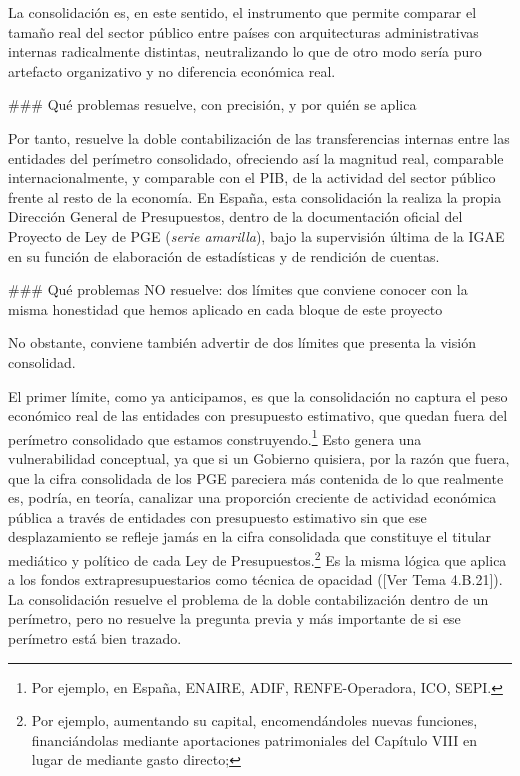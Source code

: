 \documentclass[10pt,a4paper]{article}
\newcommand{\authorfont}[1]{{\fontfamily{EBGaramond-TLF}\selectfont #1}}
\begin{document}
La consolidación es, en este sentido, el instrumento que permite comparar el tamaño real del sector público entre países con arquitecturas administrativas internas radicalmente distintas, neutralizando lo que de otro modo sería puro artefacto organizativo y no diferencia económica real.

### Qué problemas resuelve, con precisión, y por quién se aplica

Por tanto, resuelve la doble contabilización de las transferencias internas entre las entidades del perímetro consolidado, ofreciendo así la magnitud real, comparable internacionalmente, y comparable con el PIB, de la actividad del sector público frente al resto de la economía. En España, esta consolidación la realiza la propia Dirección General de Presupuestos, dentro de la documentación oficial del Proyecto de Ley de PGE (\textit{serie amarilla}), bajo la supervisión última de la IGAE en su función de elaboración de estadísticas y de rendición de cuentas.

### Qué problemas NO resuelve: dos límites que conviene conocer con la misma honestidad que hemos aplicado en cada bloque de este proyecto

No obstante, conviene también advertir de dos límites que presenta la visión consolidad. 

El primer límite, como ya anticipamos, es que la consolidación no captura el peso económico real de las entidades con presupuesto estimativo, que quedan fuera del perímetro consolidado que estamos construyendo.\footnote{Por ejemplo, en España, ENAIRE, ADIF, RENFE-Operadora, ICO, SEPI.
} Esto genera una vulnerabilidad conceptual, ya que si un Gobierno quisiera, por la razón que fuera, que la cifra consolidada de los PGE pareciera más contenida de lo que realmente es, podría, en teoría, canalizar una proporción creciente de actividad económica pública a través de entidades con presupuesto estimativo sin que ese desplazamiento se refleje jamás en la cifra consolidada que constituye el titular mediático y político de cada Ley de Presupuestos.\footnote{%
    Por ejemplo, aumentando su capital, encomendándoles nuevas funciones, financiándolas mediante aportaciones patrimoniales del Capítulo VIII en lugar de mediante gasto directo;
} Es la misma lógica que aplica a los fondos extrapresupuestarios como técnica de opacidad ([\authorfont{Ver Tema 4.B.21}]). La consolidación resuelve el problema de la doble contabilización dentro de un perímetro, pero no resuelve la pregunta previa y más importante de si ese perímetro está bien trazado.
\end{document}
